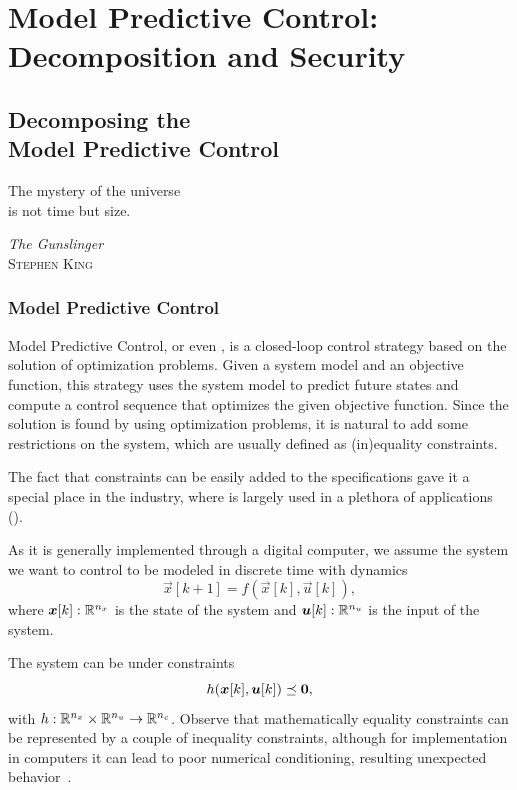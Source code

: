 \documentclass[../main.tex]{subfiles}
\begin{document}


\part{Model Predictive Control: Decomposition and Security}

\chapter[Decomposing the Model Predictive Control]{Decomposing the\\ Model Predictive Control}
\epigraph{\centering The mystery of the universe \\ is not time but size.}
{\textit{The Gunslinger}\\\textsc{Stephen King}}

\minitoc

\section{Model Predictive Control}
Model Predictive Control, or even \mpc, is a closed-loop control strategy based
on the solution of optimization problems.
Given a system model and an objective function, this strategy uses the system model to predict future states and compute a control sequence that optimizes the given objective function.
Since the solution is found by using optimization problems, it is natural to add some restrictions on the system, which are usually defined as (in)equality constraints.

The fact that constraints can be easily added to the specifications gave it a special place in the industry, where is largely used in a plethora of applications ().

As it is generally implemented through a digital computer, we assume the system we want to control to be modeled in discrete time with dynamics
\begin{equation}
\vec{x}[k+1]=f(\vec{x}[k],\vec{u}[k]),
\end{equation}
where $\boldsymbol{x}[k]:\mathbb{R}^{n_{x}}$ is the state of the system and $\boldsymbol{u}[k]:\mathbb{R}^{n_{u}}$ is the input of the system.

The system can be under constraints
\begin{equation}
 h(\boldsymbol{x}[k],\boldsymbol{u}[k])\preceq\mathbf{0},
\end{equation}
with $h:\mathbb{R}^{n_{x}}\times\mathbb{R}^{n_{u}}\to\mathbb{R}^{n_{c}}$. Observe that mathematically equality constraints can be represented by a couple of inequality constraints, although for implementation in computers it can lead to poor numerical conditioning, resulting unexpected behavior~\cite{BorrelliEtAl2017}.
\end{document}
